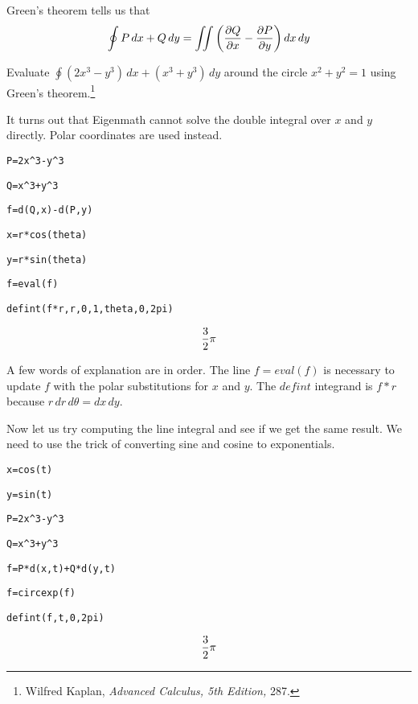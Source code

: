 
\noindent
Green's theorem tells us that
$$\oint P\,dx+Q\,dy=\int\!\!\!\int
\left({\partial Q\over\partial x}-{\partial P\over\partial y}\right)
dx\,dy$$

\noindent
Evaluate $\oint (2x^3-y^3)\,dx+(x^3+y^3)\,dy$ around the circle
$x^2+y^2=1$ using Green's theorem.\footnote{
Wilfred Kaplan, {\it Advanced Calculus, 5th Edition,} 287.}

\medskip
\noindent
It turns out that Eigenmath cannot solve the double integral over
$x$ and $y$ directly.
Polar coordinates are used instead.

\medskip
\verb$P=2x^3-y^3$

\verb$Q=x^3+y^3$

\verb$f=d(Q,x)-d(P,y)$

\verb$x=r*cos(theta)$

\verb$y=r*sin(theta)$

\verb$f=eval(f)$

\verb$defint(f*r,r,0,1,theta,0,2pi)$

$${3\over2}\pi$$

\medskip
\noindent
A few words of explanation are in order.
The line $f=eval(f)$ is necessary to update $f$ with the polar
substitutions for
$x$ and $y$.
The $defint$ integrand is $f{*}r$ because $r\,dr\,d\theta=dx\,dy$.

\medskip
\noindent
Now let us try computing the line integral and see if we get the same result.
We need to use the trick of converting sine and cosine to exponentials.


\medskip
\verb$x=cos(t)$

\verb$y=sin(t)$

\verb$P=2x^3-y^3$

\verb$Q=x^3+y^3$

\verb$f=P*d(x,t)+Q*d(y,t)$

\verb$f=circexp(f)$

\verb$defint(f,t,0,2pi)$

$${3\over2}\pi$$

